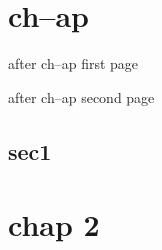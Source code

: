 \documentclass{book}
\newcommand{\Texinfothechapterheading}{}
\newcommand{\Texinfoheadingchaptername}{\chaptername}
\newcommand{\Texinfochapter}[1]{\chapter{#1}
\renewcommand{\Texinfothechapterheading}{\Texinfoheadingchaptername{} \thechapter{} }%
}%
\renewcommand{\_}{\Texinfounderscore\discretionary{}{}{}}
\begin{document}
\label{anchor:Top}%
\Texinfochapter{{ch--ap}}
\label{anchor:chapter}%

\newpage{}%
\phantom{blabla}%

after ch--ap first page

\newpage{}%
\phantom{blabla}%

after ch--ap second page

\section{{sec1}}
\label{anchor:sec1}%

\Texinfochapter{{chap 2}}
\label{anchor:chap-2}%
\end{document}
